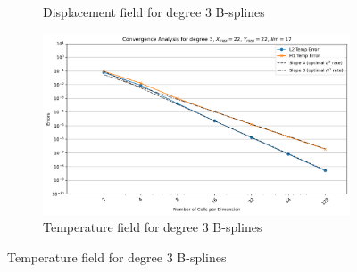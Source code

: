 \documentclass[a4paper,12pt,twoside]{report}
\begin{document}
\begin{figure}[!h]
\begin{subfigure}[b]{0.49\textwidth}
		\caption{Displacement field for degree 3 B-splines}
		\label{fig:disp_d3_lim_17}
	\end{subfigure}
	\begin{subfigure}[b]{0.49\textwidth}
		\includegraphics[width=\textwidth]{figures/figures_thermoelas_degree/Temp_X_max=22_Y_max=22_lim=17_d=3.png}
		\caption{Temperature field for degree 3 B-splines}
		\label{fig:temp_d3_lim_17}
	\end{subfigure}
\end{figure}
\newpage
\end{document}
